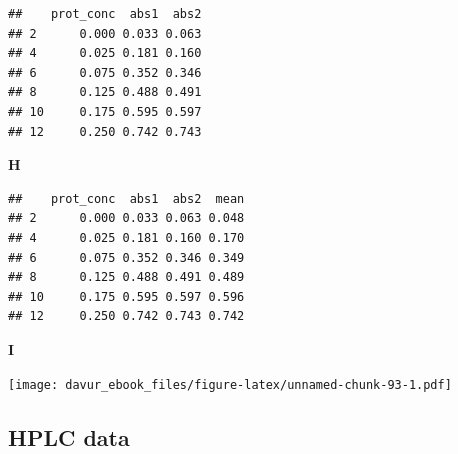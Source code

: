 \documentclass[]{book}
\newenvironment{Shaded}{\begin{snugshade}}{\end{snugshade}}
\newcommand{\DataTypeTok}[1]{\textcolor[rgb]{0.13,0.29,0.53}{#1}}
\newcommand{\DecValTok}[1]{\textcolor[rgb]{0.00,0.00,0.81}{#1}}
\newcommand{\KeywordTok}[1]{\textcolor[rgb]{0.13,0.29,0.53}{\textbf{#1}}}
\newcommand{\NormalTok}[1]{#1}
\newcommand{\OperatorTok}[1]{\textcolor[rgb]{0.81,0.36,0.00}{\textbf{#1}}}
\newcommand{\StringTok}[1]{\textcolor[rgb]{0.31,0.60,0.02}{#1}}
\begin{document}
\begin{verbatim}
##    prot_conc  abs1  abs2
## 2      0.000 0.033 0.063
## 4      0.025 0.181 0.160
## 6      0.075 0.352 0.346
## 8      0.125 0.488 0.491
## 10     0.175 0.595 0.597
## 12     0.250 0.742 0.743
\end{verbatim}

\textbf{H}

\begin{Shaded}
\end{Shaded}

\begin{verbatim}
##    prot_conc  abs1  abs2  mean
## 2      0.000 0.033 0.063 0.048
## 4      0.025 0.181 0.160 0.170
## 6      0.075 0.352 0.346 0.349
## 8      0.125 0.488 0.491 0.489
## 10     0.175 0.595 0.597 0.596
## 12     0.250 0.742 0.743 0.742
\end{verbatim}

\textbf{I}

\begin{Shaded}
\end{Shaded}

\texttt{[image: davur\_ebook\_files/figure-latex/unnamed-chunk-93-1.pdf]}

\hypertarget{hplc-data-1}{%
\subsection{HPLC data}\label{hplc-data-1}}
\end{document}
